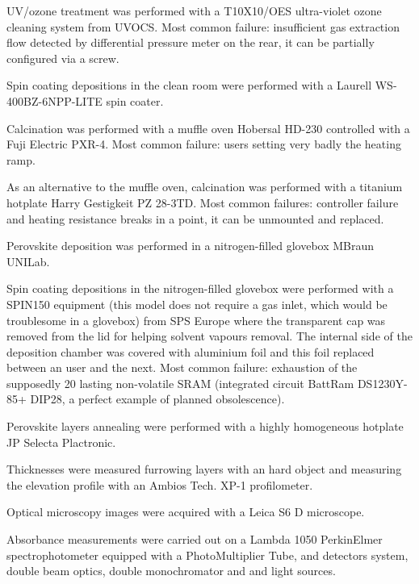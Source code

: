 	 UV/ozone treatment was performed with a T10X10/OES ultra-violet ozone cleaning system from UVOCS. Most common failure: insufficient gas extraction flow detected by differential pressure meter on the rear, it can be partially configured via a screw.

	 Spin coating depositions in the clean room were performed with a Laurell WS-400BZ-6NPP-LITE spin coater.

	 Calcination was performed with a muffle oven Hobersal HD-230 controlled with a Fuji Electric PXR-4. Most common failure: users setting very badly the heating ramp.
	
	 As an alternative to the muffle oven, calcination was performed with a titanium hotplate Harry Gestigkeit PZ 28-3TD. Most common failures: controller failure and heating resistance breaks in a point, it can be unmounted and replaced.

	 Perovskite deposition was performed in a nitrogen-filled glovebox MBraun UNILab.

	 Spin coating depositions in the nitrogen-filled glovebox were performed with a SPIN150 equipment (this model does not require a gas inlet, which would be troublesome in a glovebox) from SPS Europe where the transparent cap was removed from the lid for helping solvent vapours removal. The internal side of the deposition chamber was covered with aluminium foil and this foil replaced between an user and the next. Most common failure: exhaustion of the supposedly \SI{20}{\year} lasting non-volatile SRAM (integrated circuit BattRam DS1230Y-85+ DIP28, a perfect example of planned obsolescence).

	 Perovskite layers annealing were performed with a highly homogeneous hotplate JP Selecta Plactronic.

	 Thicknesses were measured furrowing layers with an hard object and measuring the elevation profile with an Ambios Tech. XP-1 profilometer.

	 Optical microscopy images were acquired with a Leica S6 D microscope.
	
	 Absorbance measurements were carried out on a Lambda 1050 PerkinElmer spectrophotometer equipped with a PhotoMultiplier Tube,  and  detectors system, double beam optics, double monochromator and  and  light sources.
	
